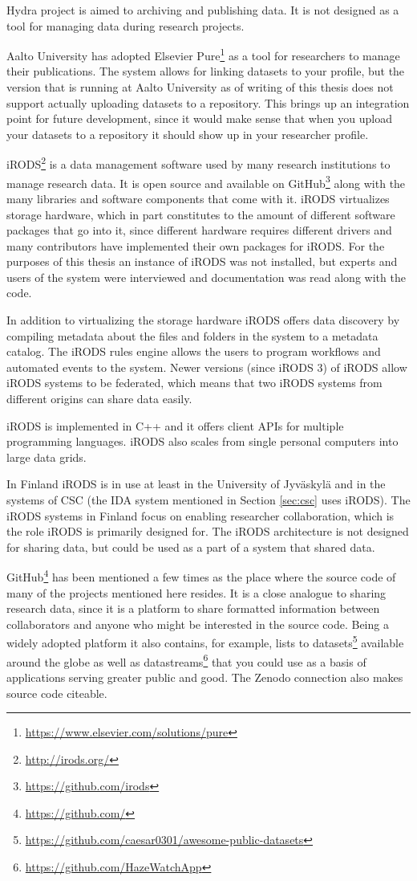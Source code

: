Hydra project is aimed to archiving and publishing data. It is not designed as
a tool for managing data during research projects.

Aalto University has adopted Elsevier
Pure\footnote{\url{https://www.elsevier.com/solutions/pure}} as a tool for
researchers to manage their publications. The system allows for linking
datasets to your profile, but the version that is running at Aalto University
as of writing of this thesis does not support actually uploading datasets
to a repository. This brings up an integration point for future development,
since it would make sense that when you upload your datasets to a repository
it should show up in your researcher profile.

iRODS\footnote{\url{http://irods.org/}} is a data management software used by many research institutions to
manage research data. It is open source and available on GitHub\footnote{\url{https://github.com/irods}}
along with the many libraries and software components that come with it. iRODS
virtualizes storage hardware, which in part constitutes to the amount of
different software packages that go into it, since different hardware requires
different drivers and many contributors have implemented their own packages for
iRODS. For the purposes of this thesis an instance of iRODS was not installed,
but experts and users of the system were interviewed and documentation was read
along with the code.

In addition to virtualizing the storage hardware iRODS offers data discovery
by compiling metadata about the files and folders in the system to a metadata
catalog. The iRODS rules engine allows the users to program workflows and
automated events to the system. Newer versions (since iRODS 3) of iRODS allow
iRODS systems to be federated, which means that two iRODS systems from
different origins can share data easily.

iRODS is implemented in C++ and it offers client APIs for multiple programming
languages. iRODS also scales from single personal computers into large data
grids.

In Finland iRODS is in use at least in the University of Jyväskylä and in the
systems of CSC (the IDA system mentioned in Section \ref{sec:csc} uses iRODS).
The iRODS systems in Finland focus on enabling researcher collaboration, which
is the role iRODS is primarily designed for. The iRODS architecture is not
designed for sharing data, but could be used as a part of a system that shared
data.

GitHub\footnote{\url{https://github.com/}} has been mentioned a few times as
the place where the source code of many of the projects mentioned here resides.
It is a close analogue to sharing research data, since it is a platform to share
formatted information between collaborators and anyone who might be interested
in the source code. Being a widely adopted platform it also contains, for
example, lists to datasets\footnote{\url{https://github.com/caesar0301/awesome-public-datasets}}
available around the globe as well as datastreams\footnote{\url{https://github.com/HazeWatchApp}}
that you could use as a basis of applications serving greater public and good.
The Zenodo connection also makes source code citeable.

